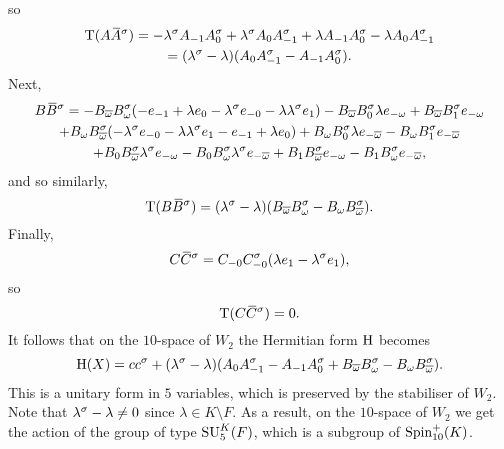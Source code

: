 so 
\begin{multline}
	\operatorname{T}(A\mathord{\mbox{\hspace*{0pt}}\,\overline{\!A\!\!\;}\!\:}\mbox{\hspace*{0pt}}^{\sigma}) = -\lambda^{\sigma} A_{-1} A_0^{\sigma} + \lambda^{\sigma} A_0 A_{-1}^{\sigma} + 
						\lambda A_{-1} A_0^{\sigma} - \lambda A_0 A_{-1}^{\sigma} \\
						= (\lambda^{\sigma} - \lambda)( A_0 A_{-1}^{\sigma} - A_{-1} A_0^{\sigma} ).
\end{multline}
Next,
\begin{multline}
	B\mathord{\mbox{\hspace*{0pt}}\,\overline{\!B\!\!\;}\!\:}\mbox{\hspace*{0pt}}^{\sigma} = -B_{\overline{\omega}}B_{\omega}^{\sigma} ( -e_{-1} + \lambda e_0 - \lambda^{\sigma} e_{-0}
					- \lambda \lambda^{\sigma} e_1) - B_{\overline{\omega}} B_0^{\sigma} \lambda e_{-\omega} 
					+ B_{\overline{\omega}} B_1^{\sigma} e_{-\omega} \\
	+ B_{\omega}B_{\overline{\omega}}^{\sigma} ( -\lambda^{\sigma} e_{-0} -\lambda \lambda^{\sigma} e_1 - e_{-1}
					+ \lambda e_0) + B_{\omega}B_0^{\sigma} \lambda e_{-\overline{\omega}} - 
					B_{\omega} B_1^{\sigma} e_{-\overline{\omega}} \\
	+ B_0 B_{\overline{\omega}}^{\sigma} \lambda^{\sigma} e_{-\omega} - B_0 B_{\omega}^{\sigma} \lambda^{\sigma}
					e_{-\overline{\omega}} + B_1 B_{\overline{\omega}}^{\sigma} e_{-\omega}
					- B_1 B_{\omega}^{\sigma} e_{-\overline{\omega}},
\end{multline}
and so similarly,
\begin{equation}
	\operatorname{T}(B\mathord{\mbox{\hspace*{0pt}}\,\overline{\!B\!\!\;}\!\:}\mbox{\hspace*{0pt}}^{\sigma}) = (\lambda^{\sigma} - \lambda) ( B_{\overline{\omega}} B_{\omega}^{\sigma} - 
					B_{\omega} B_{\overline{\omega}}^{\sigma} ).
\end{equation}
Finally,
\begin{equation}
	C\mathord{\mbox{\hspace*{0pt}}\,\overline{\!C\!\!\;}\!\:}\mbox{\hspace*{0pt}}^{\sigma} = C_{-0}C_{-0}^{\sigma}(\lambda e_1 - \lambda^{\sigma}e_1),
\end{equation}
so
\begin{equation}
	\operatorname{T}(C\mathord{\mbox{\hspace*{0pt}}\,\overline{\!C\!\!\;}\!\:}\mbox{\hspace*{0pt}}^{\sigma}) = 0.
\end{equation}
It follows that on the $10$-space of $W_2$ the Hermitian form $\mathrm{H}$ becomes
\begin{equation}
	\mathrm{H}(X) = c c^{\sigma} + (\lambda^{\sigma} - \lambda) ( A_0 A_{-1}^{\sigma} - A_{-1} A_0^{\sigma} + 
			B_{\overline{\omega}} B_{\omega}^{\sigma} - B_{\omega} B_{\overline{\omega}}^{\sigma}).
\end{equation}
This is a unitary form in $5$ variables, which is preserved by the stabiliser of $W_2$. Note that
$\lambda^{\sigma}-\lambda \neq 0$ since $\lambda \in K \setminus F$. As a result, on the $10$-space 
of $W_2$ we get the action of the group of type $\mathrm{SU}_5^K(F)$, which is a subgroup of
$\mathrm{Spin}_{10}^+(K)$. 

